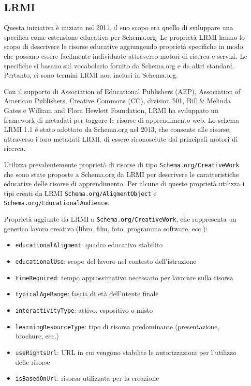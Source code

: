 \subsection{LRMI}
Questa iniziativa è iniziata nel 2011, il suo scopo era quello di sviluppare una specifica come estensione educativa per Schema.org. Le proprietà LRMI hanno lo scopo di descrivere le risorse educative aggiungendo proprietà specifiche in modo che possano essere facilmente individuate attraverso motori di ricerca e servizi. Le specifiche si basano sul vocabolario fornito da Schema.org e da altri standard. Pertanto, ci sono termini LRMI non inclusi in Schema.org. 

Con il supporto di Association of Educational Publishers (AEP), Association of American Publishers, Creative Commons (CC), division 501, Bill \& Melinda Gates e William and Flora Hewlett Foundation, LRMI ha sviluppato un framework di metadati per taggare le risorse di apprendimento web. Lo schema LRMI 1.1 è stato adottato da Schema.org nel 2013, che consente alle risorse, attraverso i loro metadati LRMI, di essere riconosciute dai principali motori di ricerca.

Utilizza prevalentemente proprietà di risorse di tipo \texttt{Schema.org/CreativeWork} che sono state proposte a Schema.org da LRMI per descrivere le caratteristiche educative delle risorse di apprendimento. Per alcune di queste proprietà utilizza i tipi creati da LRMI \texttt{Schema.org/AligmentObject} e \texttt{Schema.org/EducationalAudience}.

Proprietà aggiunte da LRMI a \texttt{Schema.org/CreativeWork}, che rappresenta un generico lavoro creativo (libro, film, foto, programma software, ecc.):
\begin{itemize}
\item \texttt{educationalAligment}: quadro educativo stabilito
\item \texttt{educationalUse}: scopo del lavoro nel contesto dell'istruzione
\item \texttt{timeRequired}: tempo approssimativo necessario per lavorare sulla risorsa
\item \texttt{typicalAgeRange}: fascia di età dell'utente finale
\item \texttt{interactivityType}: attivo, espositivo o misto
\item \texttt{learningResourceType}: tipo di risorsa predominante (presentazione, brochure, ecc.)
\item \texttt{useRightsUrl}: URL in cui vengono stabilite le autorizzazioni per l'utilizzo delle risorse
\item \texttt{isBasedOnUrl}: risorsa utilizzata per la creazione
\end{itemize}

